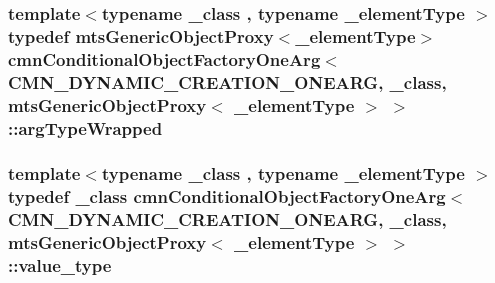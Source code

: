 \subsubsection[{arg\+Type\+Wrapped}]{\setlength{\rightskip}{0pt plus 5cm}template$<$typename \+\_\+class , typename \+\_\+element\+Type $>$ typedef {\bf mts\+Generic\+Object\+Proxy}$<$\+\_\+element\+Type$>$ {\bf cmn\+Conditional\+Object\+Factory\+One\+Arg}$<$ {\bf C\+M\+N\+\_\+\+D\+Y\+N\+A\+M\+I\+C\+\_\+\+C\+R\+E\+A\+T\+I\+O\+N\+\_\+\+O\+N\+E\+A\+R\+G}, \+\_\+class, {\bf mts\+Generic\+Object\+Proxy}$<$ \+\_\+element\+Type $>$ $>$\+::{\bf arg\+Type\+Wrapped}}\label{classcmn_conditional_object_factory_one_arg_3_01_c_m_n___d_y_n_a_m_i_c___c_r_e_a_t_i_o_n___o_n_e238fc68bde68abb82aef992b13cfbb36_aecff2801fe164f706c71f1f6abe0e2d6}
\hypertarget{classcmn_conditional_object_factory_one_arg_3_01_c_m_n___d_y_n_a_m_i_c___c_r_e_a_t_i_o_n___o_n_e238fc68bde68abb82aef992b13cfbb36_a698eb0cfa7a5e42a11a97a8f4015c196}{}
\subsubsection[{value\+\_\+type}]{\setlength{\rightskip}{0pt plus 5cm}template$<$typename \+\_\+class , typename \+\_\+element\+Type $>$ typedef \+\_\+class {\bf cmn\+Conditional\+Object\+Factory\+One\+Arg}$<$ {\bf C\+M\+N\+\_\+\+D\+Y\+N\+A\+M\+I\+C\+\_\+\+C\+R\+E\+A\+T\+I\+O\+N\+\_\+\+O\+N\+E\+A\+R\+G}, \+\_\+class, {\bf mts\+Generic\+Object\+Proxy}$<$ \+\_\+element\+Type $>$ $>$\+::{\bf value\+\_\+type}}\label{classcmn_conditional_object_factory_one_arg_3_01_c_m_n___d_y_n_a_m_i_c___c_r_e_a_t_i_o_n___o_n_e238fc68bde68abb82aef992b13cfbb36_a698eb0cfa7a5e42a11a97a8f4015c196}


